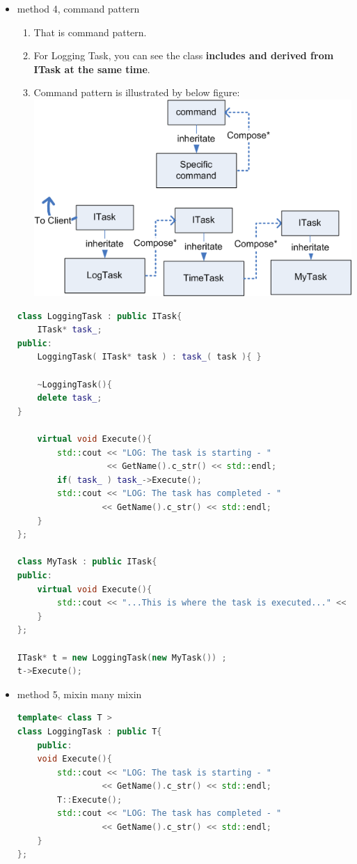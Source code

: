 \documentclass[a4paper,11pt,twoside]{book}
\begin{document}
\begin{itemize}
	\item method 4, command pattern
	\begin{enumerate}
		\item That is command pattern.
		\item For Logging Task, you can see the class \textbf{includes and derived from ITask at the same time}. 
		\item Command pattern is illustrated by below figure:
		\newline
		\includegraphics[scale=1.1]{pics/command.png}
	\end{enumerate}
\begin{lstlisting}[frame=single, language=c++]
class LoggingTask : public ITask{
	ITask* task_;
public:
	LoggingTask( ITask* task ) : task_( task ){ }
	
	~LoggingTask(){
	delete task_;
}
	
	virtual void Execute(){
		std::cout << "LOG: The task is starting - " 
		          << GetName().c_str() << std::endl;
		if( task_ ) task_->Execute();
		std::cout << "LOG: The task has completed - " 
		         << GetName().c_str() << std::endl;
	}
};
	
class MyTask : public ITask{
public:
	virtual void Execute(){
		std::cout << "...This is where the task is executed..." << std::endl;
	}
};
	
ITask* t = new LoggingTask(new MyTask()) ;
t->Execute();
\end{lstlisting}
	
	
	\item method 5, mixin many mixin

\begin{lstlisting}[frame=single, language=c++]
template< class T >
class LoggingTask : public T{
	public:
	void Execute(){
		std::cout << "LOG: The task is starting - " 
		         << GetName().c_str() << std::endl;
		T::Execute();
		std::cout << "LOG: The task has completed - " 
		         << GetName().c_str() << std::endl;
	}
};
	

\end{lstlisting}
\end{itemize}
\end{document}
